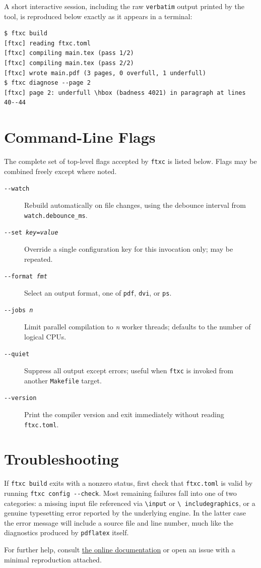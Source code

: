 \documentclass[11pt]{article}
\begin{document}
A short interactive session, including the raw \texttt{verbatim} output
printed by the tool, is reproduced below exactly as it appears in a
terminal:

\begin{verbatim}
$ ftxc build
[ftxc] reading ftxc.toml
[ftxc] compiling main.tex (pass 1/2)
[ftxc] compiling main.tex (pass 2/2)
[ftxc] wrote main.pdf (3 pages, 0 overfull, 1 underfull)
$ ftxc diagnose --page 2
[ftxc] page 2: underfull \hbox (badness 4021) in paragraph at lines 40--44
\end{verbatim}

\section{Command-Line Flags}

The complete set of top-level flags accepted by \texttt{ftxc} is listed
below. Flags may be combined freely except where noted.

\begin{description}
  \item[\texttt{-{}-watch}] Rebuild automatically on file changes, using the
        debounce interval from \texttt{watch.debounce\_ms}.
  \item[\texttt{-{}-set \emph{key}=\emph{value}}] Override a single
        configuration key for this invocation only; may be repeated.
  \item[\texttt{-{}-format \emph{fmt}}] Select an output format, one of
        \texttt{pdf}, \texttt{dvi}, or \texttt{ps}.
  \item[\texttt{-{}-jobs \emph{n}}] Limit parallel compilation to \emph{n}
        worker threads; defaults to the number of logical CPUs.
  \item[\texttt{-{}-quiet}] Suppress all output except errors; useful when
        \texttt{ftxc} is invoked from another \texttt{Makefile} target.
  \item[\texttt{-{}-version}] Print the compiler version and exit
        immediately without reading \texttt{ftxc.toml}.
\end{description}

\section{Troubleshooting}

If \texttt{ftxc build} exits with a nonzero status, first check that
\texttt{ftxc.toml} is valid by running \lstinline|ftxc config --check|.
Most remaining failures fall into one of two categories: a missing input
file referenced via \texttt{\textbackslash input} or \texttt{\textbackslash
includegraphics}, or a genuine typesetting error reported by the underlying
engine. In the latter case the error message will include a source file and
line number, much like the diagnostics produced by \texttt{pdflatex}
itself.

For further help, consult \href{https://example.org/ftxc/docs}{the online
documentation} or open an issue with a minimal reproduction attached.
\end{document}
